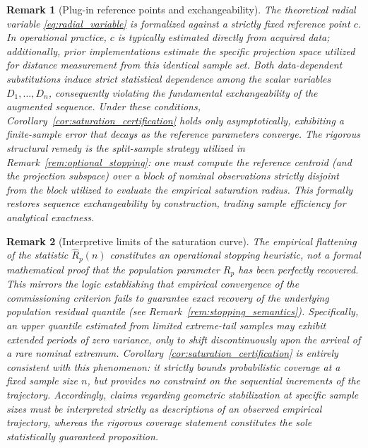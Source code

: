 \documentclass[a4paper]{cas-sc}
\newtheorem{remark}{Remark}
\begin{document}
\begin{remark}[Plug-in reference points and exchangeability]
\label{rem:plugin_centroid}
The theoretical radial variable \eqref{eq:radial_variable} is formalized against a strictly fixed reference point \(c\). In operational practice, \(c\) is typically estimated directly from acquired data; additionally, prior implementations estimate the specific projection space utilized for distance measurement from this identical sample set. Both data-dependent substitutions induce strict statistical dependence among the scalar variables \(D_1,\ldots,D_n\), consequently violating the fundamental exchangeability of the augmented sequence. Under these conditions, Corollary~\ref{cor:saturation_certification} holds only asymptotically, exhibiting a finite-sample error that decays as the reference parameters converge. The rigorous structural remedy is the split-sample strategy utilized in Remark~\ref{rem:optional_stopping}: one must compute the reference centroid (and the projection subspace) over a block of nominal observations strictly disjoint from the block utilized to evaluate the empirical saturation radius. This formally restores sequence exchangeability by construction, trading sample efficiency for analytical exactness.
\end{remark}

\begin{remark}[Interpretive limits of the saturation curve]
\label{rem:saturation_semantics}
The empirical flattening of the statistic \(\widehat R_p(n)\) constitutes an operational stopping heuristic, not a formal mathematical proof that the population parameter \(R_p\) has been perfectly recovered. This mirrors the logic establishing that empirical convergence of the commissioning criterion fails to guarantee exact recovery of the underlying population residual quantile (see Remark~\ref{rem:stopping_semantics}). Specifically, an upper quantile estimated from limited extreme-tail samples may exhibit extended periods of zero variance, only to shift discontinuously upon the arrival of a rare nominal extremum. Corollary~\ref{cor:saturation_certification} is entirely consistent with this phenomenon: it strictly bounds probabilistic coverage at a fixed sample size \(n\), but provides no constraint on the sequential increments of the trajectory. Accordingly, claims regarding geometric stabilization at specific sample sizes must be interpreted strictly as descriptions of an observed empirical trajectory, whereas the rigorous coverage statement constitutes the sole statistically guaranteed proposition.
\end{remark}
\end{document}
